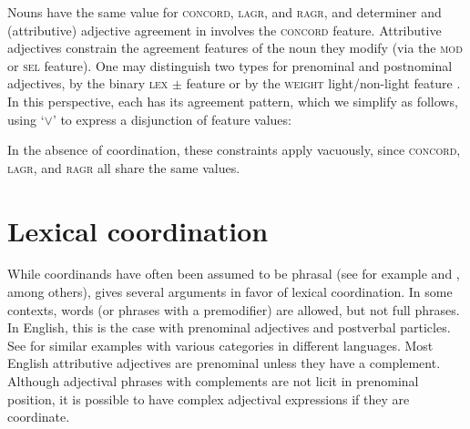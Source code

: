 \ea
{}
\z
\ea
{}  
\z

Nouns have the same value for  \textsc{concord}, \textsc{lagr}, and \textsc{ragr}, and 
determiner and (attributive) adjective agreement in   involves the  \textsc{concord} feature.
Attributive adjectives constrain the agreement features of the noun they modify (via the \textsc{mod} or \textsc{sel} feature). One may distinguish two types for prenominal and postnominal adjectives, by the binary \textsc{lex} $\pm$ feature \citep{Sadler:Arnold:94} or by the \textsc{weight} light/non-light feature \citep{Abeille:Godard:99}. In this perspective, each has its agreement pattern, which we simplify as follows, using `$\vee$' to express a disjunction of feature values:\\

\ea
{}
\z
\ea
{}
\z

\noindent
In the absence of coordination, these constraints apply vacuously, since \textsc{concord}, \textsc{lagr}, and \textsc{ragr} all share the same values. 


\section{Lexical coordination}\label{lexcoord}


While coordinands have often been assumed to be phrasal (see for example \citealt[Section~6.2]{Kayne:94} and \citealt[Section~5.2]{bruening}, among others), \citet{Abeille:06} gives several arguments in favor of lexical coordination.
In some contexts, words (or phrases with a premodifier) are allowed, but not full phrases. In English, this is the case with prenominal adjectives and postverbal particles. See \citet[Section~4]{Abeille:06} for similar examples with various categories in different languages. Most English attributive adjectives are prenominal unless they have a complement. Although  adjectival phrases with complements are not licit in prenominal position,  it is possible to have complex adjectival expressions if they are coordinate.

